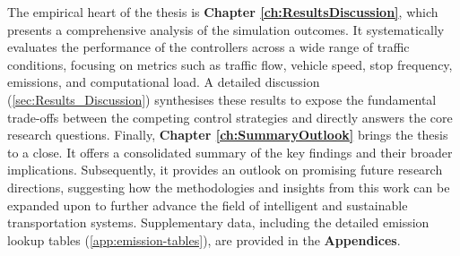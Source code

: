 \mynewline
The empirical heart of the thesis is \textbf{Chapter \ref{ch:ResultsDiscussion}}, which presents a comprehensive analysis of the simulation outcomes. It systematically evaluates the performance of the controllers across a wide range of traffic conditions, focusing on metrics such as traffic flow, vehicle speed, stop frequency, emissions, and computational load. A detailed discussion (\ref{sec:Results_Discussion}) synthesises these results to expose the fundamental trade-offs between the competing control strategies and directly answers the core research questions.
\mynewline
Finally, \textbf{Chapter \ref{ch:SummaryOutlook}} brings the thesis to a close. It offers a consolidated summary of the key findings and their broader implications. Subsequently, it provides an outlook on promising future research directions, suggesting how the methodologies and insights from this work can be expanded upon to further advance the field of intelligent and sustainable transportation systems.
\mynewline
Supplementary data, including the detailed emission lookup tables (\ref{app:emission-tables}), are provided in the \textbf{Appendices}.